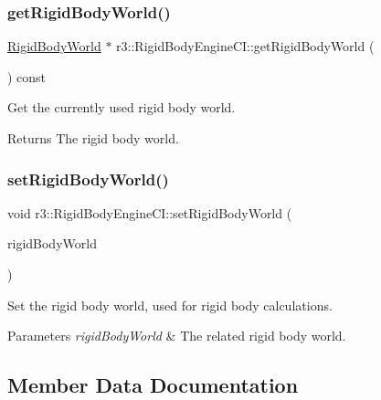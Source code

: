 \subsubsection{\texorpdfstring{get\+Rigid\+Body\+World()}{getRigidBodyWorld()}}
{\footnotesize\ttfamily \mbox{\hyperlink{classr3_1_1_rigid_body_world}{Rigid\+Body\+World}} $\ast$ r3\+::\+Rigid\+Body\+Engine\+C\+I\+::get\+Rigid\+Body\+World (\begin{DoxyParamCaption}{ }\end{DoxyParamCaption}) const}



Get the currently used rigid body world. 

\begin{DoxyReturn}{Returns}
The rigid body world. 
\end{DoxyReturn}
\mbox{\label{classr3_1_1_rigid_body_engine_c_i_a6787623e1862550ce04f1d970375b0ce}} 
\subsubsection{\texorpdfstring{set\+Rigid\+Body\+World()}{setRigidBodyWorld()}}
{\footnotesize\ttfamily void r3\+::\+Rigid\+Body\+Engine\+C\+I\+::set\+Rigid\+Body\+World (\begin{DoxyParamCaption}\item[{\mbox{\hyperlink{classr3_1_1_rigid_body_world}{Rigid\+Body\+World}} $\ast$}]{rigid\+Body\+World }\end{DoxyParamCaption})}



Set the rigid body world, used for rigid body calculations. 


\begin{DoxyParams}{Parameters}
{\em rigid\+Body\+World} & The related rigid body world. \\
\hline
\end{DoxyParams}


\subsection{Member Data Documentation}
\mbox{\label{classr3_1_1_rigid_body_engine_c_i_adb37ed2c686594f9504680be76c2dcbc}} 
